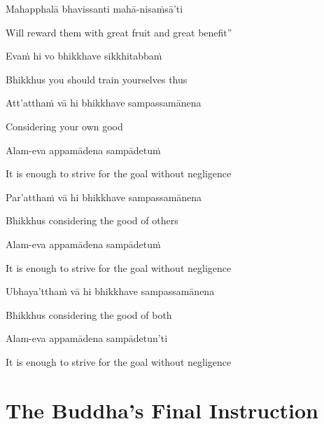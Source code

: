 Mahapphalā bhavissanti mahā-nisaṁsā'ti

\begin{cprenglish}
  Will reward them with great fruit and great benefit”
\end{cprenglish}

Evaṁ hi vo bhikkhave sikkhitabbaṁ

\begin{cprenglish}
  Bhikkhus you should train yourselves thus
\end{cprenglish}

Att’atthaṁ vā hi bhikkhave sampassamānena

\begin{cprenglish}
  Considering your own good
\end{cprenglish}

Alam-eva appamādena sampādetuṁ

\begin{cprenglish}
  It is enough to strive for the goal without negligence
\end{cprenglish}

Par’atthaṁ vā hi bhikkhave sampassamānena

\begin{cprenglish}
  Bhikkhus considering the good of others
\end{cprenglish}

Alam-eva appamādena sampādetuṁ

\begin{cprenglish}
  It is enough to strive for the goal without negligence
\end{cprenglish}

Ubhaya’tthaṁ vā hi bhikkhave sampassamānena

\begin{cprenglish}
  Bhikkhus considering the good of both
\end{cprenglish}

Alam-eva appamādena sampādetun'ti

\begin{cprenglish}
  It is enough to strive for the goal without negligence
\end{cprenglish}

\suttaRef{[SN 12.22]}

\clearpage

\section{The Buddha's Final Instruction}

